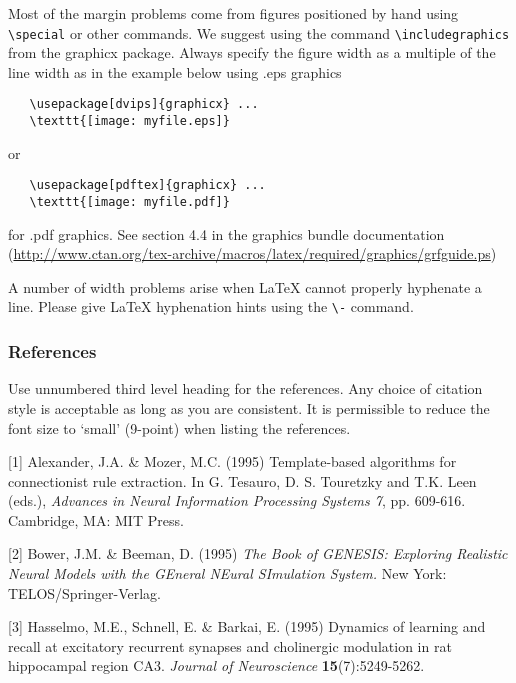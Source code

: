 \documentclass{article} %
\begin{document}
Most of the margin problems come from figures positioned by hand using
\verb+\special+ or other commands. We suggest using the command
\verb+\includegraphics+
from the graphicx package. Always specify the figure width as a multiple of
the line width as in the example below using .eps graphics
\begin{verbatim}
   \usepackage[dvips]{graphicx} ...
   \texttt{[image: myfile.eps]}
\end{verbatim}
or %
\begin{verbatim}
   \usepackage[pdftex]{graphicx} ...
   \texttt{[image: myfile.pdf]}
\end{verbatim}
for .pdf graphics.
See section 4.4 in the graphics bundle documentation (\url{http://www.ctan.org/tex-archive/macros/latex/required/graphics/grfguide.ps})

A number of width problems arise when LaTeX cannot properly hyphenate a
line. Please give LaTeX hyphenation hints using the \verb+\-+ command.



\subsubsection*{References}
Use unnumbered third level heading for
the references. Any choice of citation style is acceptable as long as you are
consistent. It is permissible to reduce the font size to `small' (9-point)
when listing the references.

\small{
[1] Alexander, J.A. \& Mozer, M.C. (1995) Template-based algorithms
for connectionist rule extraction. In G. Tesauro, D. S. Touretzky
and T.K. Leen (eds.), {\it Advances in Neural Information Processing
Systems 7}, pp. 609-616. Cambridge, MA: MIT Press.

[2] Bower, J.M. \& Beeman, D. (1995) {\it The Book of GENESIS: Exploring
Realistic Neural Models with the GEneral NEural SImulation System.}
New York: TELOS/Springer-Verlag.

[3] Hasselmo, M.E., Schnell, E. \& Barkai, E. (1995) Dynamics of learning
and recall at excitatory recurrent synapses and cholinergic modulation
in rat hippocampal region CA3. {\it Journal of Neuroscience}
{\bf 15}(7):5249-5262.
}
\end{document}
